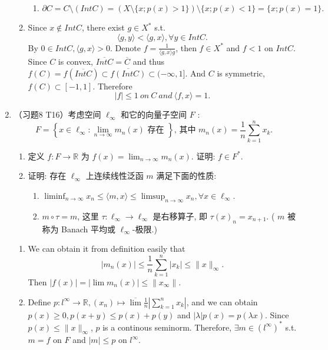 \begin{enumerate}
\begin{answer}
\begin{enumerate}
\begin{enumerate}
            \item \[\partial C = C\setminus (Int C) = (X\setminus \{x; p(x)>1\})\setminus\{x; p(x) < 1\} = \{x; p(x) = 1\}. \]
        \end{enumerate}
        \item Since $x\notin Int C$, there exist $g\in X^*$ s.t.
        \[ \langle g, y\rangle < \langle g, x\rangle, \forall y \in Int C. \]
        By $0\in Int C, \langle g, x\rangle > 0$. Denote $f = \frac1{\langle g, x\rangle g}$, then $f\in X^*$ and $f < 1$ on $Int C$. Since $C$ is convex, $\overline{Int C} = \overline C$ and thus $f(C) = f(\overline{Int C})\subset \overline{f(Int C)}\subset(-\infty, 1]$. And $C$ is symmetric, $f(C)\subset [-1, 1]$. Therefore
        \[ |f| \leq 1\ on\ C\ and \ \langle f, x\rangle = 1. \]
    \end{enumerate}
    \end{answer}
  \item （习题8 T16）考虑空间 $\ell_{\infty}$ 和它的向量子空间 $F$ :
    $$
    F=\left\{x \in \ell_{\infty}: \lim _{n \rightarrow \infty} m_{n}(x) \text { 存在 }\right\} \text {, 其中 } m_{n}(x)=\frac{1}{n} \sum_{k=1}^{n} x_{k} \text {. }
    $$
    \begin{enumerate}
        \item 定义 $f: F \rightarrow \mathbb{R}$ 为 $f(x)=\lim _{n \rightarrow \infty} m_{n}(x)$. 证明: $f \in F^{*}$.
        \item 证明: 存在 $\ell_{\infty}$ 上连续线性泛函 $m$ 满足下面的性质:\begin{enumerate}
            \item $\liminf _{n \rightarrow \infty} x_{n} \leqslant \langle m, x\rangle  \leqslant \limsup _{n \rightarrow \infty} x_{n}, \forall x \in \ell_{\infty}$.
            \item $m \circ \tau=m$, 这里 $\tau: \ell_{\infty} \rightarrow \ell_{\infty}$ 是右移算子, 即 $\tau(x)_{n}=x_{n+1}$. ( $m$ 被称为 Banach 平均或 $\ell_{\infty}$-极限.)
        \end{enumerate}
    \end{enumerate}
    \begin{answer}
      \begin{enumerate}
        \item We can obtain it from definition easily that 
        \[ |m_n(x)| \leq \frac1n\sum_{k=1}^n |x_k|\leq \|x\|_\infty. \]
        Then $|f(x)| = |\lim m_n(x)|\leq \|x_\infty\|.$
        \item Define $p: l^\infty\to \mathbb R, (x_n)\mapsto \overline\lim \frac1n|\sum_{k = 1}^nx_k|$, and we can obtain $p(x) \geq 0, p(x + y)\leq p(x) + p(y)$ and $|\lambda|p(x) = p(\lambda x)$. Since $p(x) \leq \|x\|_\infty$, $p$ is a continous seminorm. Therefore, $\exists m\in (l^\infty)^*$ s.t. $m = f$ on $F$ and $|m|\leq p$ on $l^\infty$. 
        

\end{enumerate}
\end{answer}
\end{enumerate}
